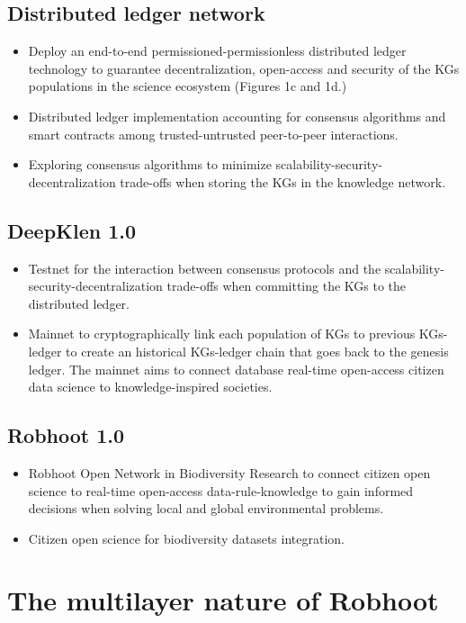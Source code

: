 \documentclass[10pt, a4paper, twocolumn]{article} %
\begin{document}
  \subsection{Distributed ledger network}
  \begin{itemize}
  \item Deploy an end-to-end permissioned-permissionless distributed
    ledger technology to guarantee decentralization, open-access and
    security of the KGs populations in the science ecosystem (Figures
    1c and 1d.)
  \item Distributed ledger implementation accounting for consensus
    algorithms and smart contracts among trusted-untrusted
    peer-to-peer interactions.
  \item Exploring consensus algorithms to minimize
    scalability-security-decentralization trade-offs when storing the
    KGs in the knowledge network.
  \end{itemize}
  \subsection{DeepKlen 1.0}  
  \begin{itemize}
  \item Testnet for the interaction between consensus protocols and
    the scalability-security-decentralization trade-offs when
    committing the KGs to the distributed ledger.
  \item Mainnet to cryptographically link each population of KGs to
    previous KGs-ledger to create an historical KGs-ledger chain that
    goes back to the genesis ledger. The mainnet aims to connect
    database real-time open-access citizen data science to
    knowledge-inspired societies.
  \end{itemize}
 \subsection{Robhoot 1.0}
 \begin{itemize}
 \item Robhoot Open Network in Biodiversity Research to connect
   citizen open science to real-time open-access data-rule-knowledge
   to gain informed decisions when solving local and global
   environmental problems.
 \item Citizen open science for biodiversity datasets integration.
\end{itemize}
\section{The multilayer nature of Robhoot}
\end{document}
